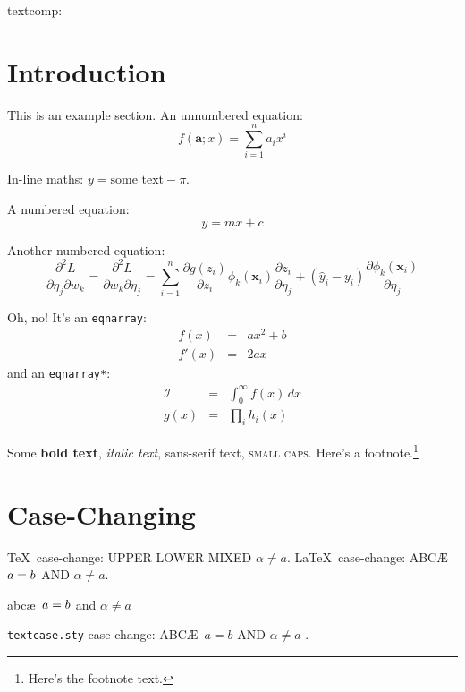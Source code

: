 \documentclass{article}
\newcommand*{\pfrac}[2]{\frac{\partial#1}{\partial#2}}
\newcommand*{\dpfrac}[3]{\frac{\partial^2#1}{\partial#2\partial#3}}
\renewcommand*{\vec}[1]{\boldsymbol{#1}}
\begin{document}



textcomp: \texttwosuperior\ \texteuro

\section{Introduction}
\label{sec:intro}

This is an example section. An unnumbered equation:
\[
  f(\vec{a}; x) = \sum_{i=1}^n a_i x^i
\]

In-line maths: $y = \text{some text} - \pi$.

A numbered equation:
\begin{equation}
y = m x + c
\label{eq:mx+c}
\end{equation}

Another numbered equation:
\begin{equation}\label{eq:dp}
 \dpfrac{L}{\eta_j}{w_k}
 = \dpfrac{L}{w_k}{\eta_j}
 = \sum_{i=1}^n \pfrac{g(z_i)}{z_i}
   \phi_k(\vec{x}_i)\pfrac{z_i}{\eta_j}
 + (\hat{y}_i - y_i)\pfrac{\phi_k(\vec{x}_i)}{\eta_j}
\end{equation}

Oh, no! It's an \texttt{eqnarray}:
\begin{eqnarray}
f(x) &=& ax^2 +b\label{eq:f}\\
f'(x) &=& 2ax\label{eq:df}
\end{eqnarray}
and an \texttt{eqnarray*}:
\begin{eqnarray*}
\mathcal{I} & = & \int_0^\infty f(x)\,dx\\
g(x) & = & \prod_i h_i(x)
\end{eqnarray*}

Some \textbf{bold text}, \textit{italic text}, 
\textsf{sans-serif text}, \textsc{small caps}.
Here's a footnote.\footnote{Here's the footnote text.}

\section{Case-Changing}
\label{sec:casechange}

\TeX\ case-change: \uppercase{upper \lowercase{LOWER} MiXeD $\alpha \neq a$.}
\LaTeX\ case-change: \MakeUppercase{abc\ae\ \protect\( a = b
\protect\) and $\alpha \neq a$}.

{abc\ae\ \protect\( a = b
\protect\) and $\alpha \neq a$}

\texttt{textcase.sty} case-change: \MakeTextUppercase{abc\ae\ \( a = b \) and 
$\alpha \neq a$ }.
\end{document}
